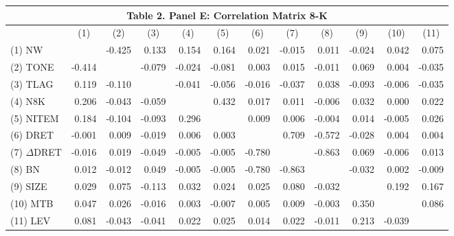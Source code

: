 \begin{table}[H] \label{T2PE}
  \centering
    \begin{tabular}{lrrrrrrrrrrr}
    \multicolumn{12}{c}{\textbf{Table 2. Panel E: Correlation Matrix 8-K}} \\
    \midrule
    \midrule
      & \multicolumn{1}{c}{(1)} & \multicolumn{1}{c}{(2)} & \multicolumn{1}{c}{(3)} & \multicolumn{1}{c}{(4)} & \multicolumn{1}{c}{(5)} & \multicolumn{1}{c}{(6)} & \multicolumn{1}{c}{(7)} & \multicolumn{1}{c}{(8)} & \multicolumn{1}{c}{(9)} & \multicolumn{1}{c}{(10)} & \multicolumn{1}{c}{(11)} \\
    \midrule
    (1) NW & & -0.425 & 0.133 & 0.154 & 0.164 & 0.021 & -0.015 & 0.011 & -0.024 & 0.042 & 0.075 \\
    (2) TONE & -0.414 & & -0.079 & -0.024 & -0.081 & 0.003 & 0.015 & -0.011 & 0.069 & 0.004 & -0.035 \\
    (3) TLAG & 0.119 & -0.110 & & -0.041 & -0.056 & -0.016 & -0.037 & 0.038 & -0.093 & -0.006 & -0.035 \\
    (4) N8K & 0.206 & -0.043 & -0.059 & & 0.432 & 0.017 & 0.011 & -0.006 & 0.032 & 0.000 & 0.022 \\
    (5) NITEM & 0.184 & -0.104 & -0.093 & 0.296 & & 0.009 & 0.006 & -0.004 & 0.014 & -0.005 & 0.026 \\
    (6) DRET & -0.001 & 0.009 & -0.019 & 0.006 & 0.003 & & 0.709 & -0.572 & -0.028 & 0.004 & 0.004 \\
    (7) $\Delta$DRET & -0.016 & 0.019 & -0.049 & -0.005 & -0.005 & -0.780 & & -0.863 & 0.069 & -0.006 & 0.013 \\
    (8) BN & 0.012 & -0.012 & 0.049 & -0.005 & -0.005 & -0.780 & -0.863 & & -0.032 & 0.002 & -0.009 \\
    (9) SIZE & 0.029 & 0.075 & -0.113 & 0.032 & 0.024 & 0.025 & 0.080 & -0.032 & & 0.192 & 0.167 \\
    (10) MTB & 0.047 & 0.026 & -0.016 & 0.003 & -0.007 & 0.005 & 0.009 & -0.003 & 0.350 & & 0.086 \\
    (11) LEV & 0.081 & -0.043 & -0.041 & 0.022 & 0.025 & 0.014 & 0.022 & -0.011 & 0.213 & -0.039 & \\
    \bottomrule
    \bottomrule
    \end{tabular}%
  \label{tab:addlabel}%
\end{table}%
